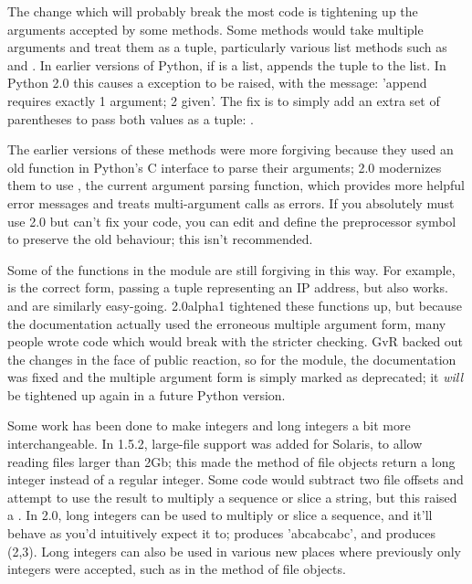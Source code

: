 \documentclass{howto}
\begin{document}
The change which will probably break the most code is tightening up
the arguments accepted by some methods.  Some methods would take
multiple arguments and treat them as a tuple, particularly various
list methods such as  and .
In earlier versions of Python, if  is a list,  appends the tuple  to the list.  In Python 2.0 this
causes a  exception to be raised, with the
message: 'append requires exactly 1 argument; 2 given'.  The fix is to
simply add an extra set of parentheses to pass both values as a tuple: 
.

The earlier versions of these methods were more forgiving because they
used an old function in Python's C interface to parse their arguments;
2.0 modernizes them to use , the current
argument parsing function, which provides more helpful error messages
and treats multi-argument calls as errors.  If you absolutely must use
2.0 but can't fix your code, you can edit 
and define the preprocessor symbol  to
preserve the old behaviour; this isn't recommended.

Some of the functions in the  module are still
forgiving in this way.  For example,  is the correct form, passing a tuple representing
an IP address, but  also
works.  and  are
similarly easy-going.  2.0alpha1 tightened these functions up, but
because the documentation actually used the erroneous multiple
argument form, many people wrote code which would break with the
stricter checking.  GvR backed out the changes in the face of public
reaction, so for the module, the documentation was
fixed and the multiple argument form is simply marked as deprecated;
it \emph{will} be tightened up again in a future Python version.

Some work has been done to make integers and long integers a bit more
interchangeable.  In 1.5.2, large-file support was added for Solaris,
to allow reading files larger than 2Gb; this made the 
method of file objects return a long integer instead of a regular
integer.  Some code would subtract two file offsets and attempt to use
the result to multiply a sequence or slice a string, but this raised a
.  In 2.0, long integers can be used to multiply
or slice a sequence, and it'll behave as you'd intuitively expect it
to;  produces 'abcabcabc', and  produces (2,3). Long integers can also be used in
various new places where previously only integers were accepted, such
as in the  method of file objects.
\end{document}
